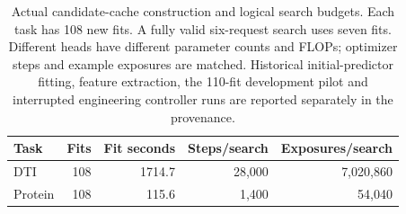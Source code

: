 \begin{table}[htbp]
\centering\small
\caption{Actual candidate-cache construction and logical search budgets. Each task has 108 new fits. A fully valid six-request search uses seven fits. Different heads have different parameter counts and FLOPs; optimizer steps and example exposures are matched. Historical initial-predictor fitting, feature extraction, the 110-fit development pilot and interrupted engineering controller runs are reported separately in the provenance.}
\label{tab:expanded-recipe-cost}
\begin{tabular}{lrrrr}
\toprule
Task & Fits & Fit seconds & Steps/search & Exposures/search \\
\midrule
DTI & 108 & 1714.7 & 28,000 & 7,020,860 \\
Protein & 108 & 115.6 & 1,400 & 54,040 \\
\bottomrule
\end{tabular}
\end{table}
